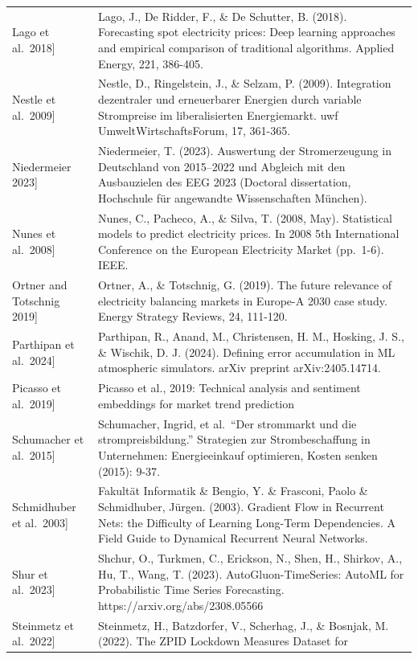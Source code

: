 \documentclass[a4paper]{article}
\begin{document}
{\begin{longtable}[]{@{}
  >{\raggedright\arraybackslash}p{}
  >{\raggedright\arraybackslash}p{}@{}}
{[}Lago et al.~2018{]} & Lago, J., De Ridder, F., \& De Schutter, B.
(2018). Forecasting spot electricity prices: Deep learning approaches
and empirical comparison of traditional algorithms. Applied Energy, 221,
386-405. \\
{[}Nestle et al.~2009{]} & Nestle, D., Ringelstein, J., \& Selzam, P.
(2009). Integration dezentraler und erneuerbarer Energien durch variable
Strompreise im liberalisierten Energiemarkt. uwf UmweltWirtschaftsForum,
17, 361-365. \\
{[}Niedermeier 2023{]} & Niedermeier, T. (2023). Auswertung der
Stromerzeugung in Deutschland von 2015--2022 und Abgleich mit den
Ausbauzielen des EEG 2023 (Doctoral dissertation, Hochschule für
angewandte Wissenschaften München). \\
{[}Nunes et al.~2008{]} & Nunes, C., Pacheco, A., \& Silva, T. (2008,
May). Statistical models to predict electricity prices. In 2008 5th
International Conference on the European Electricity Market (pp.~1-6).
IEEE. \\
{[}Ortner and Totschnig 2019{]} & Ortner, A., \& Totschnig, G. (2019).
The future relevance of electricity balancing markets in Europe-A 2030
case study. Energy Strategy Reviews, 24, 111-120. \\
{[}Parthipan et al.~2024{]} & Parthipan, R., Anand, M., Christensen, H.
M., Hosking, J. S., \& Wischik, D. J. (2024). Defining error
accumulation in ML atmospheric simulators. arXiv preprint
arXiv:2405.14714. \\
{[}Picasso et al.~2019{]} & Picasso et al., 2019: Technical analysis and
sentiment embeddings for market trend prediction \\
{[}Schumacher et al.~2015{]} & Schumacher, Ingrid, et al.~``Der
strommarkt und die strompreisbildung.'' Strategien zur Strombeschaffung
in Unternehmen: Energieeinkauf optimieren, Kosten senken (2015):
9-37. \\
{[}Schmidhuber et al.~2003{]} & Fakultät Informatik \& Bengio, Y. \&
Frasconi, Paolo \& Schmidhuber, Jürgen. (2003). Gradient Flow in
Recurrent Nets: the Difficulty of Learning Long-Term Dependencies. A
Field Guide to Dynamical Recurrent Neural Networks. \\
{[}Shur et al.~2023{]} & Shchur, O., Turkmen, C., Erickson, N., Shen,
H., Shirkov, A., Hu, T., Wang, T. (2023). AutoGluon-TimeSeries: AutoML
for Probabilistic Time Series Forecasting.
https://arxiv.org/abs/2308.05566 \\
{[}Steinmetz et al.~2022{]} & Steinmetz, H., Batzdorfer, V., Scherhag,
J., \& Bosnjak, M. (2022). The ZPID Lockdown Measures Dataset for

\end{longtable}}
\end{document}
